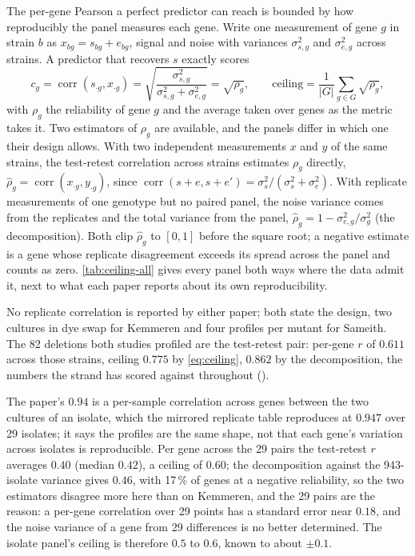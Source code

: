 The per-gene Pearson a perfect predictor can reach is bounded by how reproducibly the
panel measures each gene. Write one measurement of gene $g$ in strain $b$ as
$x_{bg} = s_{bg} + e_{bg}$, signal and noise with variances $\sigma_{s,g}^2$ and
$\sigma_{e,g}^2$ across strains. A predictor that recovers $s$ exactly scores
%
\begin{equation}
  c_g = \operatorname{corr}(s_{\cdot g}, x_{\cdot g})
      = \sqrt{\frac{\sigma_{s,g}^2}{\sigma_{s,g}^2 + \sigma_{e,g}^2}}
      = \sqrt{\rho_g},
  \qquad
  \text{ceiling} = \frac{1}{|G|} \sum_{g \in G} \sqrt{\rho_g},
  \label{eq:ceiling}
\end{equation}
%
with $\rho_g$ the reliability of gene $g$ and the average taken over genes as the metric
takes it. Two estimators of $\rho_g$ are available, and the panels differ in which one
their design allows. With two independent measurements $x$ and $y$ of the same strains,
the test-retest correlation across strains estimates $\rho_g$ directly,
$\hat\rho_g = \operatorname{corr}(x_{\cdot g}, y_{\cdot g})$, since
$\operatorname{corr}(s + e, s + e') = \sigma_s^2 / (\sigma_s^2 + \sigma_e^2)$. With
replicate measurements of one genotype but no paired panel, the noise variance comes from
the replicates and the total variance from the panel,
$\hat\rho_g = 1 - \sigma_{e,g}^2 / \sigma_{g}^2$ (the decomposition). Both clip
$\hat\rho_g$ to $[0, 1]$ before the square root; a negative estimate is a gene whose
replicate disagreement exceeds its spread across the panel and counts as zero.
\cref{tab:ceiling-all} gives every panel both ways where the data admit it, next to what
each paper reports about its own reproducibility.



 No replicate correlation is reported by either paper; both
state the design, two cultures in dye swap for Kemmeren and four profiles per mutant for
Sameith. The 82 deletions both studies profiled are the test-retest pair: per-gene $r$
of $0.611$ across those strains, ceiling $0.775$ by \cref{eq:ceiling}, $0.862$ by the
decomposition, the numbers the strand has scored against throughout
().

 The paper's $0.94$ is a per-sample correlation across genes between the
two cultures of an isolate, which the mirrored replicate table reproduces at $0.947$
over 29 isolates; it says the profiles are the same shape, not that each gene's
variation across isolates is reproducible. Per gene across the 29 pairs the test-retest
$r$ averages $0.40$ (median $0.42$), a ceiling of $0.60$; the decomposition against the
943-isolate variance gives $0.46$, with 17\,\% of genes at a negative reliability, so the
two estimators disagree more here than on Kemmeren, and the 29 pairs are the reason:
a per-gene correlation over 29 points has a standard error near $0.18$, and the noise
variance of a gene from 29 differences is no better determined. The isolate panel's
ceiling is therefore $0.5$ to $0.6$, known to about $\pm 0.1$.

